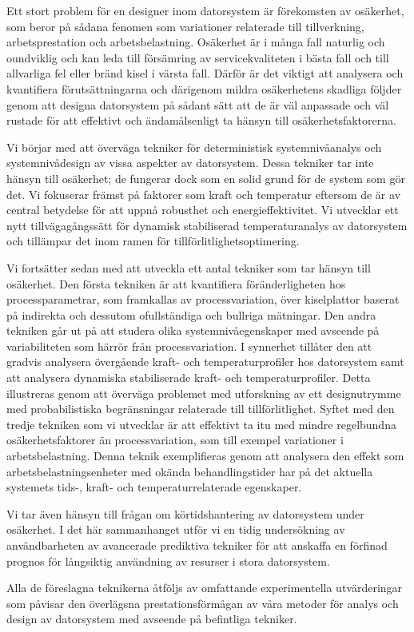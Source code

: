 Ett stort problem för en designer inom datorsystem är förekomsten av osäkerhet,
som beror på sådana fenomen som variationer relaterade till tillverkning,
arbetsprestation och arbetsbelastning. Osäkerhet är i många fall naturlig och
oundviklig och kan leda till försämring av servicekvaliteten i bästa fall och
till allvarliga fel eller bränd kisel i värsta fall. Därför är det viktigt att
analysera och kvantifiera förutsättningarna och därigenom mildra osäkerhetens
skadliga följder genom att designa datorsystem på sådant sätt att de är väl
anpassade och väl rustade för att effektivt och ändamålsenligt ta hänsyn till
osäkerhetsfaktorerna.

Vi börjar med att överväga tekniker för deterministisk systemnivåanalys och
systemnivådesign av vissa aspekter av datorsystem. Dessa tekniker tar inte
hänsyn till osäkerhet; de fungerar dock som en solid grund för de system som gör
det. Vi fokuserar främst på faktorer som kraft och temperatur eftersom de är av
central betydelse för att uppnå robusthet och energieffektivitet. Vi utvecklar
ett nytt tillvägagångssätt för dynamisk stabiliserad temperaturanalys av
datorsystem och tillämpar det inom ramen för tillförlitlighetsoptimering.

Vi fortsätter sedan med att utveckla ett antal tekniker som tar hänsyn till
osäkerhet. Den första tekniken är att kvantifiera föränderligheten hos
processparametrar, som framkallas av processvariation, över kiselplattor baserat
på indirekta och dessutom ofullständiga och bullriga mätningar. Den andra
tekniken går ut på att studera olika systemnivåegenskaper med avseende på
variabiliteten som härrör från processvariation. I synnerhet tillåter den att
gradvis analysera övergående kraft- och temperaturprofiler hos datorsystem samt
att analysera dynamiska stabiliserade kraft- och temperaturprofiler. Detta
illustreras genom att överväga problemet med utforskning av ett designutrymme
med probabilistiska begränsningar relaterade till tillförlitlighet. Syftet med
den tredje tekniken som vi utvecklar är att effektivt ta itu med mindre
regelbundna osäkerhetsfaktorer än processvariation, som till exempel variationer
i arbetsbelastning. Denna teknik exemplifieras genom att analysera den effekt
som arbetsbelastningsenheter med okända behandlingstider har på det aktuella
systemets tids-, kraft- och temperaturrelaterade egenskaper.

Vi tar även hänsyn till frågan om körtidshantering av datorsystem under
osäkerhet. I det här sammanhanget utför vi en tidig undersökning av
användbarheten av avancerade prediktiva tekniker för att anskaffa en förfinad
prognos för långsiktig användning av resurser i stora datorsystem.

Alla de föreslagna teknikerna åtföljs av omfattande experimentella utvärderingar
som påvisar den överlägsna prestationsförmågan av våra metoder för analys och
design av datorsystem med avseende på befintliga tekniker.


